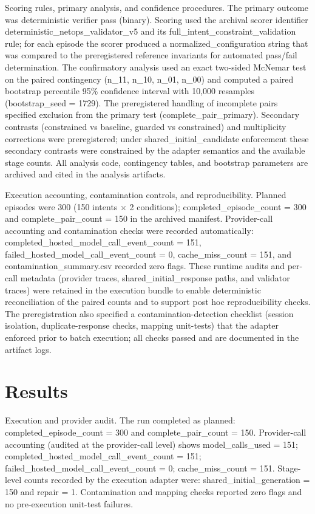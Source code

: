 \documentclass[conference]{IEEEtran}
\begin{document}
Scoring rules, primary analysis, and confidence procedures. The primary outcome was deterministic verifier pass (binary). Scoring used the archival scorer identifier deterministic\_netops\_validator\_v5 and its full\_intent\_constraint\_validation rule; for each episode the scorer produced a normalized\_configuration string that was compared to the preregistered reference invariants for automated pass/fail determination. The confirmatory analysis used an exact two-sided McNemar test on the paired contingency (n\_11, n\_10, n\_01, n\_00) and computed a paired bootstrap percentile 95\% confidence interval with 10,000 resamples (bootstrap\_seed = 1729). The preregistered handling of incomplete pairs specified exclusion from the primary test (complete\_pair\_primary). Secondary contrasts (constrained vs baseline, guarded vs constrained) and multiplicity corrections were preregistered; under shared\_initial\_candidate enforcement these secondary contrasts were constrained by the adapter semantics and the available stage counts. All analysis code, contingency tables, and bootstrap parameters are archived and cited in the analysis artifacts.

Execution accounting, contamination controls, and reproducibility. Planned episodes were 300 (150 intents \ensuremath{\times} 2 conditions); completed\_episode\_count = 300 and complete\_pair\_count = 150 in the archived manifest. Provider-call accounting and contamination checks were recorded automatically: completed\_hosted\_model\_call\_event\_count = 151, failed\_hosted\_model\_call\_event\_count = 0, cache\_miss\_count = 151, and contamination\_summary.csv recorded zero flags. These runtime audits and per-call metadata (provider traces, shared\_initial\_response paths, and validator traces) were retained in the execution bundle to enable deterministic reconciliation of the paired counts and to support post hoc reproducibility checks. The preregistration also specified a contamination-detection checklist (session isolation, duplicate-response checks, mapping unit-tests) that the adapter enforced prior to batch execution; all checks passed and are documented in the artifact logs.

\section{Results}
Execution and provider audit. The run completed as planned: completed\_episode\_count = 300 and complete\_pair\_count = 150. Provider-call accounting (audited at the provider-call level) shows model\_calls\_used = 151; completed\_hosted\_model\_call\_event\_count = 151; failed\_hosted\_model\_call\_event\_count = 0; cache\_miss\_count = 151. Stage-level counts recorded by the execution adapter were: shared\_initial\_generation = 150 and repair = 1. Contamination and mapping checks reported zero flags and no pre-execution unit-test failures.
\end{document}
